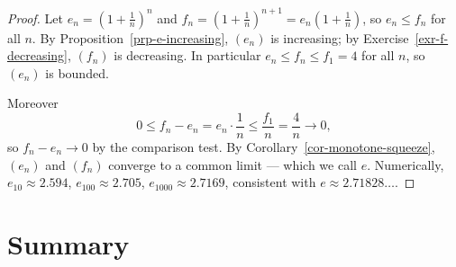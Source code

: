 \documentclass[
  letterpaper,
  DIV=11,
  numbers=noendperiod]{scrreprt}
\theoremstyle{plain}
\theoremstyle{plain}
\theoremstyle{definition}
\theoremstyle{definition}
\theoremstyle{definition}
\theoremstyle{plain}
\theoremstyle{plain}
\theoremstyle{remark}
\begin{document}
\begin{proof}
Let \(e_n = \left(1+\tfrac1n\right)^n\) and
\(f_n = \left(1+\tfrac1n\right)^{n+1} = e_n\left(1+\tfrac1n\right)\), so
\(e_n \le f_n\) for all \(n\). By Proposition~\ref{prp-e-increasing},
\((e_n)\) is increasing; by Exercise~\ref{exr-f-decreasing}, \((f_n)\)
is decreasing. In particular \(e_n \le f_n \le f_1 = 4\) for all \(n\),
so \((e_n)\) is bounded.

Moreover \[
0 \le f_n - e_n = e_n\cdot\frac1n \le \frac{f_1}{n} = \frac4n \longrightarrow 0,
\] so \(f_n - e_n \to 0\) by the comparison test. By
Corollary~\ref{cor-monotone-squeeze}, \((e_n)\) and \((f_n)\) converge
to a common limit --- which we call \(e\). Numerically,
\(e_{10} \approx 2.594\), \(e_{100}\approx 2.705\),
\(e_{1000}\approx 2.7169\), consistent with \(e\approx 2.71828\ldots\).
\end{proof}

\section{Summary}\label{summary-5}
\end{document}
